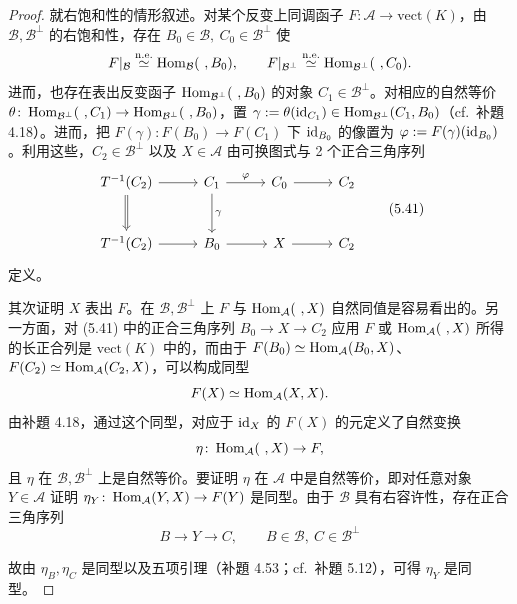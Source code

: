 \begin{proof}
就右饱和性的情形叙述。对某个反变上同调函子 $F \colon \mathcal{A} \to \mathrm{vect}(K)$，由 $\mathcal{B}, \mathcal{B}^{\perp}$ 的右饱和性，存在 $B_{0} \in \mathcal{B},\ C_{0} \in \mathcal{B}^{\perp}$ 使
\[
  F|_{\mathcal{B}} \overset{\mathrm{n.e.}}{\simeq} \operatorname{Hom}_{\mathcal{B}}(\ ,B_{0}), \qquad
  F|_{\mathcal{B}^{\perp}} \overset{\mathrm{n.e.}}{\simeq} \operatorname{Hom}_{\mathcal{B}^{\perp}}(\ ,C_{0}).
\]
进而，也存在表出反变函子 $\operatorname{Hom}_{\mathcal{B}^{\perp}}(\ ,B_{0})$ 的对象 $C_{1} \in \mathcal{B}^{\perp}$。对相应的自然等价 $\theta \colon \Hom_{\mathcal{B}^{\perp}}(\ ,C_{1}) \to \Hom_{\mathcal{B}^{\perp}}(\ ,B_{0})$，置 $\gamma := \theta(\mathrm{id}_{C_{1}}) \in \operatorname{Hom}_{\mathcal{B}^{\perp}}(C_{1},B_{0})$（cf.\ 补題 4.18）。进而，把 $F(\gamma) \colon F(B_{0}) \to F(C_{1})$ 下 $\mathrm{id}_{B_{0}}$ 的像置为 $\varphi := F(\gamma)(\mathrm{id}_{B_{0}})$。利用这些，$C_{2} \in \mathcal{B}^{\perp}$ 以及 $X \in \mathcal{A}$ 由可换图式与 2 个正合三角序列
\begin{equation}
\begin{tikzcd}[row sep=2.6em, column sep=2.8em]
  T^{-1}(C_{2}) \arrow[r] \arrow[d, Rightarrow] & C_{1} \arrow[r,"\varphi"] \arrow[d,"\gamma"] & C_{0} \arrow[r] & C_{2}\\
  T^{-1}(C_{2}) \arrow[r] & B_{0} \arrow[r] & X \arrow[r] & C_{2}
\end{tikzcd}
\tag{5.41}
\end{equation}
定义。

其次证明 $X$ 表出 $F$。在 $\mathcal{B}, \mathcal{B}^{\perp}$ 上 $F$ 与 $\operatorname{Hom}_{\mathcal{A}}(\ ,X)$ 自然同值是容易看出的。另一方面，对 (5.41) 中的正合三角序列 $B_{0} \to X \to C_{2}$ 应用 $F$ 或 $\operatorname{Hom}_{\mathcal{A}}(\ ,X)$ 所得的长正合列是 $\mathrm{vect}(K)$ 中的，而由于 $F(B_{0}) \simeq \operatorname{Hom}_{\mathcal{A}}(B_{0},X)$、$F(C_{2}) \simeq \operatorname{Hom}_{\mathcal{A}}(C_{2},X)$，可以构成同型
\[
  F(X) \simeq \operatorname{Hom}_{\mathcal{A}}(X,X).
\]
由补題 4.18，通过这个同型，对应于 $\mathrm{id}_{X}$ 的 $F(X)$ 的元定义了自然变换
\[
  \eta \colon \operatorname{Hom}_{\mathcal{A}}(\ ,X) \to F,
\]
且 $\eta$ 在 $\mathcal{B}, \mathcal{B}^{\perp}$ 上是自然等价。要证明 $\eta$ 在 $\mathcal{A}$ 中是自然等价，即对任意对象 $Y \in \mathcal{A}$ 证明 $\eta_{Y} \colon \operatorname{Hom}_{\mathcal{A}}(Y,X) \to F(Y)$ 是同型。由于 $\mathcal{B}$ 具有右容许性，存在正合三角序列
\[
  B \to Y \to C, \qquad B \in \mathcal{B},\ C \in \mathcal{B}^{\perp}
\]

故由 $\eta_{B}, \eta_{C}$ 是同型以及五项引理（补題 4.53；cf.\ 补題 5.12），可得 $\eta_{Y}$ 是同型。
\end{proof}

